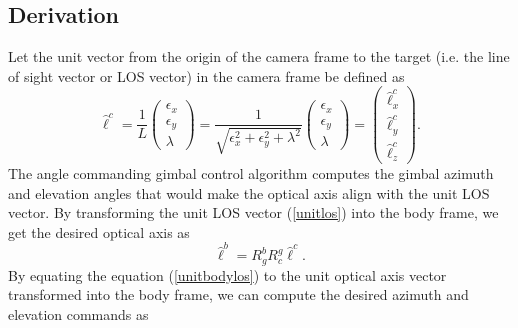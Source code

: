 \subsection{Derivation}
Let the unit vector from the origin of the camera frame to the target (i.e. the line of sight vector or LOS vector) in the camera frame be defined as 
\begin{equation}
\hat{\ell}^c=\frac{1}{L}
\begin{pmatrix}
\epsilon_x \\
\epsilon_y \\
\lambda
\end{pmatrix}
=\frac{1}{\sqrt{\epsilon_x^2+\epsilon_y^2+\lambda^2}}
\begin{pmatrix}
\epsilon_x \\
\epsilon_y \\
\lambda
\end{pmatrix}
=\begin{pmatrix}
\hat{\ell}_x^c \\
\hat{\ell}_y^c \\
\hat{\ell}_z^c
\end{pmatrix}.
\label{unitlos}
\end{equation}
The angle commanding gimbal control algorithm computes the gimbal azimuth and elevation angles that would make the optical axis align with the unit LOS vector. By transforming the unit LOS vector (\ref{unitlos}) into the body frame, we get the desired optical axis as
\begin{equation}
\hat{\ell}^b=R_{g}^b R_{c}^g\hat{\ell}^c.
\label{unitbodylos}
\end{equation}
By equating the equation (\ref{unitbodylos}) to the unit optical axis vector transformed into the body frame, we can compute the desired azimuth and elevation commands as
